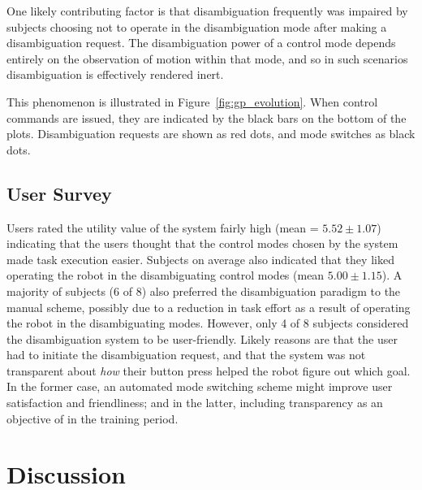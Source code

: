\documentclass[natbib, twocolumn]{svjour3}          %
\begin{document}
One likely contributing factor is that disambiguation frequently was impaired by subjects choosing not to operate in the disambiguation mode after making a disambiguation request. The disambiguation power of a control mode depends entirely on the observation of motion within that mode, and so in such scenarios disambiguation is effectively rendered inert.

This phenomenon is illustrated in Figure~\ref{fig:gp_evolution}. When control commands are issued, they are indicated by the black bars on the bottom of the plots. Disambiguation requests are shown as red dots, and mode switches as black dots. 

\subsection{User Survey}

Users rated the utility value of the system fairly high (mean = $5.52 \pm 1.07$) indicating that the users thought that the control modes chosen by the system made task execution easier. Subjects on average also indicated that they liked operating the robot in the disambiguating control modes (mean $5.00 \pm 1.15$). A majority of subjects (6 of 8) also preferred the disambiguation paradigm to the manual scheme, possibly due to a reduction in task effort as a result of operating the robot in the disambiguating modes.  However, only 4 of 8 subjects considered the disambiguation system to be user-friendly. Likely reasons are that the user had to initiate the disambiguation request, and that the system was not transparent about \textit{how} their button press helped the robot figure out which goal. In the former case, an automated mode switching scheme might improve user satisfaction and friendliness; and in the latter, including transparency as an objective of in the training period.
%
\section{Discussion}\label{sec:discussions}
 
\end{document}
